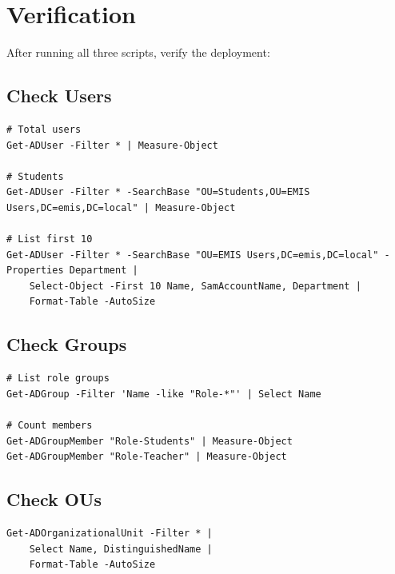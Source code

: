 ﻿\documentclass[12pt,a4paper]{article}
\begin{document}
\section{Verification}

After running all three scripts, verify the deployment:

\subsection{Check Users}

\begin{lstlisting}
# Total users
Get-ADUser -Filter * | Measure-Object

# Students
Get-ADUser -Filter * -SearchBase "OU=Students,OU=EMIS Users,DC=emis,DC=local" | Measure-Object

# List first 10
Get-ADUser -Filter * -SearchBase "OU=EMIS Users,DC=emis,DC=local" -Properties Department |
    Select-Object -First 10 Name, SamAccountName, Department |
    Format-Table -AutoSize
\end{lstlisting}

\subsection{Check Groups}

\begin{lstlisting}
# List role groups
Get-ADGroup -Filter 'Name -like "Role-*"' | Select Name

# Count members
Get-ADGroupMember "Role-Students" | Measure-Object
Get-ADGroupMember "Role-Teacher" | Measure-Object
\end{lstlisting}

\subsection{Check OUs}

\begin{lstlisting}
Get-ADOrganizationalUnit -Filter * |
    Select Name, DistinguishedName |
    Format-Table -AutoSize
\end{lstlisting}
\end{document}
